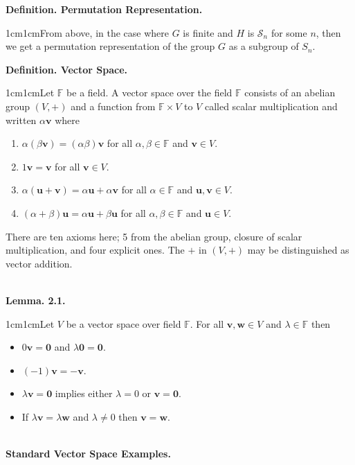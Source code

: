 \documentclass{article}
\newcommand{\vect}[1]{\mathbf{#1}}
\newcommand{\definition}[2]{\textbf{Definition. #1.}\begin{adjustwidth}{1cm}{1cm}#2\end{adjustwidth}}
\newcommand{\lemma}[2]{\textbf{Lemma. #1.}\begin{adjustwidth}{1cm}{1cm}#2\end{adjustwidth}}
\begin{document}
\definition{Permutation Representation}{From above, in the case where $G$ is finite and $H$ is $\mathcal{S}_n$ for some $n$, then we get a permutation representation of the group $G$ as a subgroup of $S_n$.}\newpage
\definition{Vector Space}{Let $\mathbb{F}$ be a field. A vector space over the field $\mathbb{F}$ consists of an abelian group $(V, +)$ and a function from $\mathbb{F} \times V$ to $V$ called scalar multiplication and written $\alpha \vect{v}$ where \begin{enumerate} \item $\alpha(\beta \vect{v}) = (\alpha \beta)\vect{v}$ for all $\alpha, \beta \in \mathbb{F}$ and $\vect{v} \in V$. \item $1\vect{v} = \vect{v}$ for all $\vect{v} \in V$. \item $\alpha (\vect{u} + \vect{v}) = \alpha \vect{u} + \alpha \vect{v}$ for all $\alpha \in \mathbb{F}$ and $\vect{u}, \vect{v} \in V$. \item $(\alpha + \beta) \vect{u} = \alpha \vect{u} + \beta \vect{u}$ for all $\alpha, \beta \in \mathbb{F}$ and $\vect{u} \in V$.\end{enumerate}There are ten axioms here; 5 from the abelian group, closure of scalar multiplication, and four explicit ones. The $+$ in $(V, +)$ may be distinguished as vector addition.}~\\
\lemma{2.1}{Let $V$ be a vector space over field $\mathbb{F}$. For all $\vect{v}, \vect{w} \in V$ and $\lambda \in \mathbb{F}$ then \begin{itemize}
  \item $0\vect{v} = \vect{0}$ and $\lambda \vect{0} = \vect{0}$.
  \item $(-1)\vect{v} = -\vect{v}$.
  \item $\lambda \vect{v} = \vect{0}$ implies either $\lambda = 0$ or $\vect{v} = \vect{0}$.
  \item If $\lambda \vect{v} = \lambda \vect{w}$ and $\lambda \neq 0$ then $\vect{v} = \vect{w}$.
\end{itemize}}~\\
\textbf{Standard Vector Space Examples.}
\end{document}
